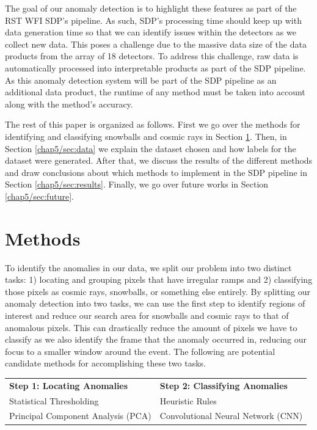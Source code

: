 The goal of our anomaly detection is to highlight these features as part of the RST WFI SDP's pipeline. 
As such, SDP's processing time should keep up with data generation time so that we can identify issues within the detectors as we collect new data. 
This poses a challenge due to the massive data size of the data products from the array of 18 detectors. 
To address this challenge, raw data is automatically processed into interpretable products as part of the SDP pipeline. 
As this anomaly detection system will be part of the SDP pipeline as an additional data product, the runtime of any method must be taken into account along with the method's accuracy. 

The rest of this paper is organized as follows.
First we go over the methods for identifying and classifying snowballs and cosmic rays in Section \ref{chap5/sec:methods}.
Then, in Section \ref{chap5/sec:data} we explain the dataset chosen and how labels for the dataset were generated.
After that, we discuss the results of the different methods and draw conclusions about which methods to implement in the SDP pipeline in Section \ref{chap5/sec:results}.
Finally, we go over future works in Section \ref{chap5/sec:future}.

\section{Methods}
\label{chap5/sec:methods}
To identify the anomalies in our data, we split our problem into two distinct tasks: 1) locating and grouping pixels that have irregular ramps and 2) classifying those pixels as cosmic rays, snowballs, or something else entirely.
By splitting our anomaly detection into two tasks, we can use the first step to identify regions of interest and reduce our search area for snowballs and cosmic rays to that of anomalous pixels.
This can drastically reduce the amount of pixels we have to classify as we also identify the frame that the anomaly occurred in, reducing our focus to a smaller window around the event. 
The following are potential candidate methods for accomplishing these two tasks.

\begin{table}[h]
    \centering
    \begin{tabular}{l|l}
        \textbf{Step 1: Locating Anomalies} & \textbf{Step 2: Classifying Anomalies} \\
        Statistical Thresholding & Heuristic Rules\cite{cillis2018snowballs} \\
        Principal Component Analysis (PCA)\cite{wold1987principal} & Convolutional Neural Network (CNN)\cite{gu2018recent}
    \end{tabular}
    \label{chap5/tab:methods}
\end{table}

